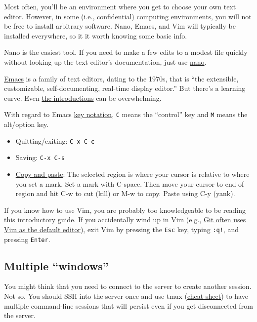 Most often, you'll be an environment where you get to choose your own text editor.
However, in some (i.e., confidential) computing environments, you will not be free to install arbitrary software.
Nano, Emacs, and Vim will typically be installed everywhere, so it it worth knowing some basic info.

Nano is the easiest tool.
If you need to make a few edits to a modest file quickly without looking up the text editor's documentation, just use \href{https://www.nano-editor.org/docs.php}{nano}.

\href{https://en.wikipedia.org/wiki/Emacs}{Emacs} is a family of text editors, dating to the 1970s, that is ``the extensible, customizable, self-documenting, real-time display editor.''
But there's a learning curve.
Even \href{https://www.gnu.org/software/emacs/tour/}{the introductions} can be overwhelming.

With regard to Emacs \href{https://www.emacswiki.org/emacs/EmacsKeyNotation}{key notation},
\texttt{C} means the ``control'' key and \texttt{M} means the alt/option key.

\begin{itemize}
	\item Quitting/exiting: \texttt{C-x C-c}
	\item Saving: \texttt{C-x C-s}
	\item \href{https://www.emacswiki.org/emacs/CopyAndPaste}{Copy and paste}:
	The selected region is where your cursor is relative to where you set a mark.
	Set a mark with C-space.
	Then move your cursor to end of region and hit C-w to cut (kill) or M-w to copy.
	Paste using C-y (yank).
\end{itemize}

If you know how to use Vim, you are probably too knowledgeable to be reading this introductory guide.
If you accidentally wind up in Vim (e.g., \href{https://www.oreilly.com/library/view/gitlab-cookbook/9781783986842/apas07.html}{Git often uses Vim as the default editor}),
exit Vim by pressing the \texttt{Esc} key, typing \texttt{:q!}, and pressing \texttt{Enter}.

\subsection{Multiple ``windows''}

You might think that you need to connect to the server to create another session.
Not so.
You should SSH into the server once and use tmux (\href{https://tmuxcheatsheet.com/}{cheat sheet}) to have multiple command-line sessions that will persist even if you get disconnected from the server.

